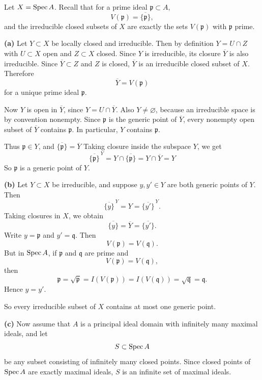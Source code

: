 \documentclass[12pt]{article}
\begin{document}
\begin{solution}
    Let \(X=\operatorname{Spec} A\). Recall that for a prime ideal \(\mathfrak p\subset A\),
    \[
        V(\mathfrak p)=\overline{\{\mathfrak p\}},
    \]
    and the irreducible closed subsets of \(X\) are exactly the sets \(V(\mathfrak p)\) with \(\mathfrak p\) prime.

    \medskip

    \textbf{(a)} Let \(Y\subset X\) be locally closed and irreducible. Then by definition $Y=U\cap Z$
    with \(U\subset X\) open and \(Z\subset X\) closed. Since \(Y\) is irreducible, its closure \(\overline Y\) is also irreducible. Since \(\overline Y\subset Z\) and \(Z\) is closed, \(\overline Y\) is an irreducible closed subset of \(X\). Therefore
    \[
        \overline Y = V(\mathfrak p)
    \]
    for a unique prime ideal \(\mathfrak p\).

    Now \(Y\) is open in \(\overline Y\), since
    $Y=U\cap \overline Y$. Also \(Y\neq \varnothing\), because an irreducible space is by convention nonempty. Since \(\mathfrak p\) is the generic point of \(\overline Y\), every nonempty open subset of \(\overline Y\) contains \(\mathfrak p\). In particular, \(Y\) contains \(\mathfrak p\).

    Thus \(\mathfrak p\in Y\), and $\overline{\{\mathfrak p\}}=\overline Y$
    Taking closure inside the subspace \(Y\), we get
    \[
        \overline{\{\mathfrak p\}}^{\,Y}
        =
        Y\cap \overline{\{\mathfrak p\}}
        =
        Y\cap \overline Y
        =
        Y
    \]
    So \(\mathfrak p\) is a generic point of \(Y\).

    \textbf{(b)} Let \(Y\subset X\) be irreducible, and suppose \(y,y'\in Y\) are both generic points of \(Y\). Then
    \[
        \overline{\{y\}}^{\,Y}=Y=\overline{\{y'\}}^{\,Y}.
    \]
    Taking closures in \(X\), we obtain
    \[
        \overline{\{y\}}=\overline Y=\overline{\{y'\}}.
    \]
    Write \(y=\mathfrak p\) and \(y'=\mathfrak q\). Then
    \[
        V(\mathfrak p)=V(\mathfrak q).
    \]
    But in \(\operatorname{Spec} A\), if \(\mathfrak p\) and \(\mathfrak q\) are prime and
    \[
        V(\mathfrak p)=V(\mathfrak q),
    \]
    then
    \[
        \mathfrak p=\sqrt{\mathfrak p}=I(V(\mathfrak p))=I(V(\mathfrak q))=\sqrt{\mathfrak q}=\mathfrak q.
    \]
    Hence \(y=y'\).

    So every irreducible subset of \(X\) contains at most one generic point.

    \textbf{(c)} Now assume that \(A\) is a principal ideal domain with infinitely many maximal ideals, and let
    \[
        S\subset \operatorname{Spec} A
    \]
    be any subset consisting of infinitely many closed points. Since closed points of \(\operatorname{Spec} A\) are exactly maximal ideals, \(S\) is an infinite set of maximal ideals.


\end{solution}
\end{document}
